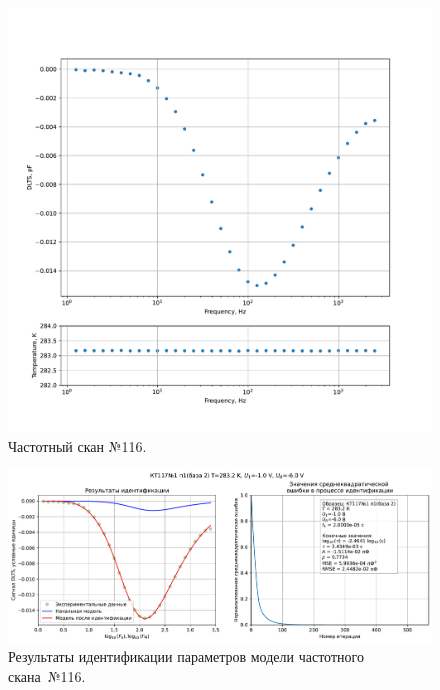 \begin{figure}[!ht]
    \centering
    \includegraphics[width=1\textwidth]{../plots/КТ117№1_п1(база 2)_2500Гц-1Гц_1пФ_+10С_-1В-6В_200мВ_20мкс_шаг_0,1.pdf}
    \caption{Частотный скан №116.}
    \label{pic:frequency_scan_116}
\end{figure}

\begin{figure}[!ht]
    \centering
    \includegraphics[width=1\textwidth]{../plots/КТ117№1_п1(база 2)_2500Гц-1Гц_1пФ_+10С_-1В-6В_200мВ_20мкс_шаг_0,1_model.pdf}
    \caption{Результаты идентификации параметров модели частотного скана~№116.}
    \label{pic:frequency_scan_model116}
\end{figure}

\pagebreak


